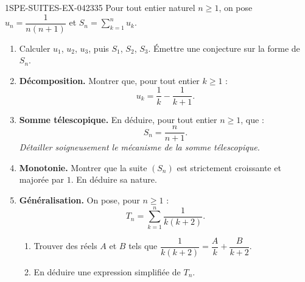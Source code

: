 \begin{exercice}{1SPE-SUITES-EX-042}{3}{35}
Pour tout entier naturel $n \geq 1$, on pose $u_n = \dfrac{1}{n(n+1)}$ et $S_n = \displaystyle\sum_{k=1}^{n} u_k$.

\begin{enumerate}
  \item Calculer $u_1$, $u_2$, $u_3$, puis $S_1$, $S_2$, $S_3$. Émettre une conjecture sur la forme de $S_n$.

  \item \textbf{Décomposition.} Montrer que, pour tout entier $k \geq 1$ :
  \[
    u_k = \frac{1}{k} - \frac{1}{k+1}.
  \]

  \item \textbf{Somme télescopique.} En déduire, pour tout entier $n \geq 1$, que :
  \[
    S_n = \frac{n}{n+1}.
  \]
  \textit{Détailler soigneusement le mécanisme de la somme télescopique.}

  \item \textbf{Monotonie.} Montrer que la suite $(S_n)$ est strictement croissante et majorée par $1$. En déduire sa nature.

  \item \textbf{Généralisation.} On pose, pour $n \geq 1$ :
  \[
    T_n = \sum_{k=1}^{n} \frac{1}{k(k+2)}.
  \]
  \begin{enumerate}
    \item Trouver des réels $A$ et $B$ tels que $\dfrac{1}{k(k+2)} = \dfrac{A}{k} + \dfrac{B}{k+2}$.
    \item En déduire une expression simplifiée de $T_n$.
  \end{enumerate}
\end{enumerate}
\end{exercice}
